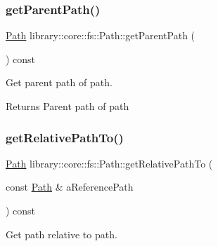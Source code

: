\subsubsection{\texorpdfstring{getParentPath()}{getParentPath()}}
{\footnotesize\ttfamily \mbox{\hyperlink{classlibrary_1_1core_1_1fs_1_1_path}{Path}} library\+::core\+::fs\+::\+Path\+::get\+Parent\+Path (\begin{DoxyParamCaption}{ }\end{DoxyParamCaption}) const}



Get parent path of path. 


\begin{DoxyCode}{0}
\end{DoxyCode}


\begin{DoxyReturn}{Returns}
Parent path of path 
\end{DoxyReturn}
\mbox{\label{classlibrary_1_1core_1_1fs_1_1_path_a8f24340e887cfbfe675e96c0ba92321f}} 
\subsubsection{\texorpdfstring{getRelativePathTo()}{getRelativePathTo()}}
{\footnotesize\ttfamily \mbox{\hyperlink{classlibrary_1_1core_1_1fs_1_1_path}{Path}} library\+::core\+::fs\+::\+Path\+::get\+Relative\+Path\+To (\begin{DoxyParamCaption}\item[{const \mbox{\hyperlink{classlibrary_1_1core_1_1fs_1_1_path}{Path}} \&}]{a\+Reference\+Path }\end{DoxyParamCaption}) const}



Get path relative to path. 


